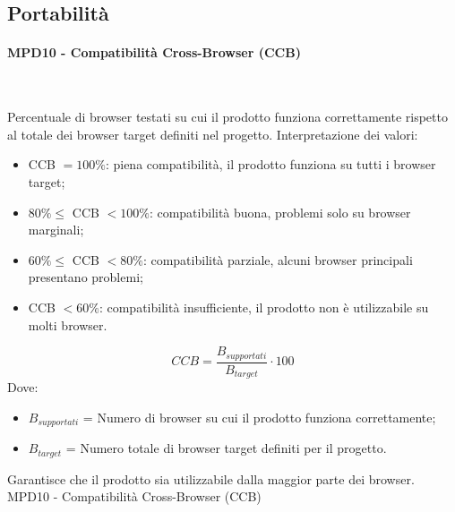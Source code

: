 \documentclass[10pt, letterpaper]{article}
\newcommand{\trisubsection}[1]{\paragraph{#1}\mbox{}\\}
\begin{document}
\subsection{Portabilità}
\trisubsection{MPD10 - Compatibilità Cross-Browser (CCB)}
{Percentuale di browser testati su cui il prodotto funziona correttamente
    rispetto al totale dei browser target definiti nel progetto.
    Interpretazione dei valori:
    \begin{itemize}
        \item CCB $= 100\%$: piena compatibilità, il prodotto funziona su tutti i browser target;
        \item $80\% \leq $ CCB $ < 100\%$: compatibilità buona, problemi solo su browser marginali;
        \item $60\% \leq $ CCB $ < 80\%$: compatibilità parziale, alcuni browser principali presentano problemi;
        \item CCB $< 60\%$: compatibilità insufficiente, il prodotto non è utilizzabile su molti browser.
    \end{itemize}}
{\[ CCB = \frac{B_{supportati}}{B_{target}} \cdot 100 \]
    Dove:
    \begin{itemize}
        \item $B_{supportati}$ = Numero di browser su cui il prodotto funziona correttamente;
        \item $B_{target}$ = Numero totale di browser target definiti per il progetto.
    \end{itemize}}
{Garantisce che il prodotto sia utilizzabile dalla maggior parte dei browser.}
{MPD10 - Compatibilità Cross-Browser (CCB)}
\end{document}
